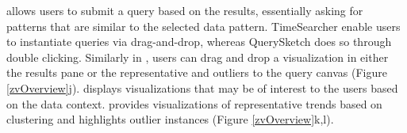 allows users to submit a query based on the results, essentially asking for patterns that are similar to the selected data pattern. TimeSearcher enable users to instantiate queries via drag-and-drop, whereas QuerySketch does so through double clicking. Similarly in \zv, users can drag and drop a visualization in either the results pane or the representative and outliers to the query canvas (Figure \ref{zvOverview}j). %
 displays visualizations that may be of interest to the users based on the data context. \zv provides visualizations of representative trends based on clustering and highlights outlier instances (Figure \ref{zvOverview}k,l).%

